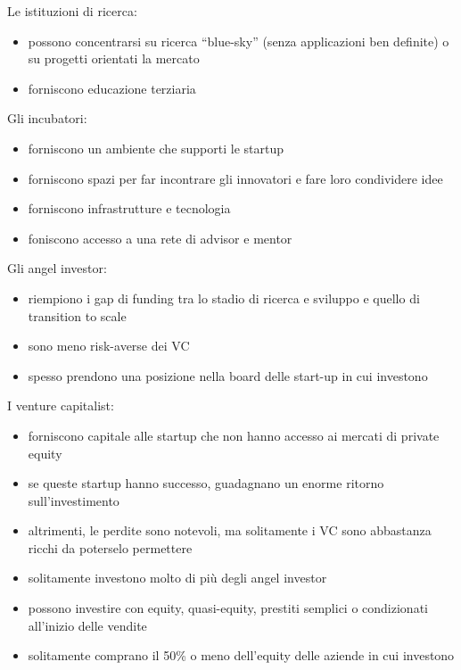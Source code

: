 \documentclass[answers, a4paper, 11pt]{exam}
\begin{document}
Le istituzioni di ricerca:

\begin{itemize}
    \item possono concentrarsi su ricerca ``blue-sky'' (senza applicazioni ben definite) o su progetti orientati la mercato
    \item forniscono educazione terziaria
\end{itemize}

Gli incubatori:

\begin{itemize}
    \item forniscono un ambiente che supporti le startup
    \item forniscono spazi per far incontrare gli innovatori e fare loro condividere idee
    \item forniscono infrastrutture e tecnologia
    \item foniscono accesso a una rete di advisor e mentor
\end{itemize}

Gli angel investor:

\begin{itemize}
    \item riempiono i gap di funding tra lo stadio di ricerca e sviluppo e quello di transition to scale
    \item sono meno risk-averse dei VC
    \item spesso prendono una posizione nella board delle start-up in cui investono
\end{itemize}

I venture capitalist:

\begin{itemize}
    \item forniscono capitale alle startup che non hanno accesso ai mercati di private equity
    \item se queste startup hanno successo, guadagnano un enorme ritorno sull'investimento
    \item altrimenti, le perdite sono notevoli, ma solitamente i VC sono abbastanza ricchi da poterselo permettere
    \item solitamente investono molto di più degli angel investor
    \item possono investire con equity, quasi-equity, prestiti semplici o condizionati all'inizio delle vendite
    \item solitamente comprano il 50\% o meno dell'equity delle aziende in cui investono
\end{itemize}
\end{document}
